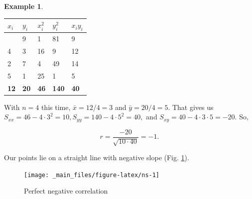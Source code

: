\documentclass[
]{book}
\theoremstyle{definition}
\theoremstyle{definition}
\newtheorem{example}{Example}[chapter]
\theoremstyle{definition}
\theoremstyle{definition}
\theoremstyle{remark}
\begin{document}
\begin{examplebox}

\begin{example}
\protect\hypertarget{exm:requalneg1}{}\label{exm:requalneg1}\leavevmode

\begin{longtable}[]{@{}lllll@{}}
\toprule\noalign{}
\(x_i\) & \(y_i\) & \(x_i^2\) & \(y_i^2\) & \(x_i y_i\) \\
\midrule\noalign{}
\endhead
\bottomrule\noalign{}
\endlastfoot
1 & 9 & 1 & 81 & 9 \\
4 & 3 & 16 & 9 & 12 \\
2 & 7 & 4 & 49 & 14 \\
5 & 1 & 25 & 1 & 5 \\
\textbf{12} & \textbf{20} & \textbf{46} & \textbf{140} & \textbf{40} \\
\end{longtable}

With \(n=4\) this time, \(\bar{x}=12/4=3\) and \(\bar{y}=20/4=5.\) That gives us \(S_{xx}=46-4\cdot3^2=10,S_{yy}=140-4\cdot 5^2=40,\) and \(S_{xy}=40-4\cdot 3\cdot 5=-20.\) So,

\[r=\frac{-20}{\sqrt{10\cdot40}}=-1.\]

Our points lie on a straight line with negative slope (Fig. \ref{fig:ns}).

\end{example}

\end{examplebox}

\begin{figure}

{\centering \texttt{[image: \_main\_files/figure-latex/ns-1]} 

}

\caption{Perfect negative correlation}\label{fig:ns}
\end{figure}
\end{document}
